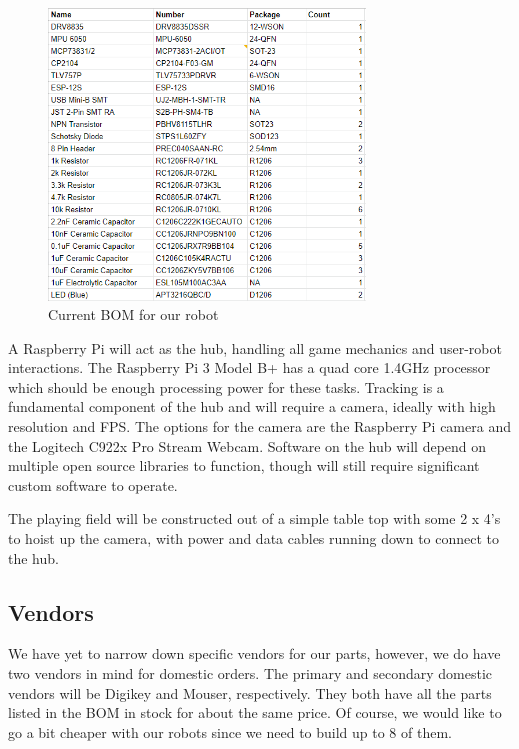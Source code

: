 \documentclass[11pt]{ieeeconf}
\begin{document}
 \begin{figure}[h]
  \centering
  \captionsetup{justification=centering}
      \includegraphics[width=0.75\textwidth]{images/bom.png}
        \caption{Current BOM for our robot}
        \label{robobom}
\end{figure}

A Raspberry Pi will act as the hub, handling all game mechanics and user-robot interactions. The Raspberry Pi 3 Model B+ has a quad core 1.4GHz processor which should be enough processing power for these tasks. Tracking is a fundamental component of the hub and will require a camera, ideally with high resolution and FPS. The options for the camera are the Raspberry Pi camera and the Logitech C922x Pro Stream Webcam. Software on the hub will depend on multiple open source libraries to function, though will still require significant custom software to operate.

The playing field will be constructed out of a simple table top with some 2 x 4's to hoist up the camera, with power and data cables running down to connect to the hub.

\subsection{Vendors}

We have yet to narrow down specific vendors for our parts, however, we do have two vendors in mind for domestic orders. The primary and secondary domestic vendors will be Digikey and Mouser, respectively. They both have all the parts listed in the BOM in stock for about the same price. Of course, we would like to go a bit cheaper with our robots since we need to build up to 8 of them.
\end{document}

